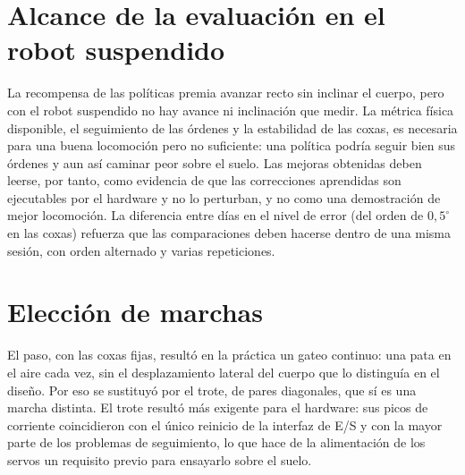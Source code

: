 \section{Alcance de la evaluación en el robot suspendido}

La recompensa de las políticas premia avanzar recto sin inclinar el cuerpo,
pero con el robot suspendido no hay avance ni inclinación que medir. La métrica
física disponible, el seguimiento de las órdenes y la estabilidad de las coxas,
es necesaria para una buena locomoción pero no suficiente: una política podría
seguir bien sus órdenes y aun así caminar peor sobre el suelo. Las mejoras
obtenidas deben leerse, por tanto, como evidencia de que las correcciones
aprendidas son ejecutables por el hardware y no lo perturban, y no como una
demostración de mejor locomoción. La diferencia entre días en el nivel de error
(del orden de $0{,}5^\circ$ en las coxas) refuerza que las comparaciones deben
hacerse dentro de una misma sesión, con orden alternado y varias repeticiones.

\section{Elección de marchas}\label{sec:eleccion-marchas}

El paso, con las coxas fijas, resultó en la práctica un gateo continuo: una pata
en el aire cada vez, sin el desplazamiento lateral del cuerpo que lo distinguía
en el diseño. Por eso se sustituyó por el trote, de pares diagonales, que sí es
una marcha distinta. El trote resultó más exigente para el hardware: sus picos
de corriente coincidieron con el único reinicio de la interfaz de E/S y con la
mayor parte de los problemas de seguimiento, lo que hace de la alimentación de
los servos un requisito previo para ensayarlo sobre el suelo.

